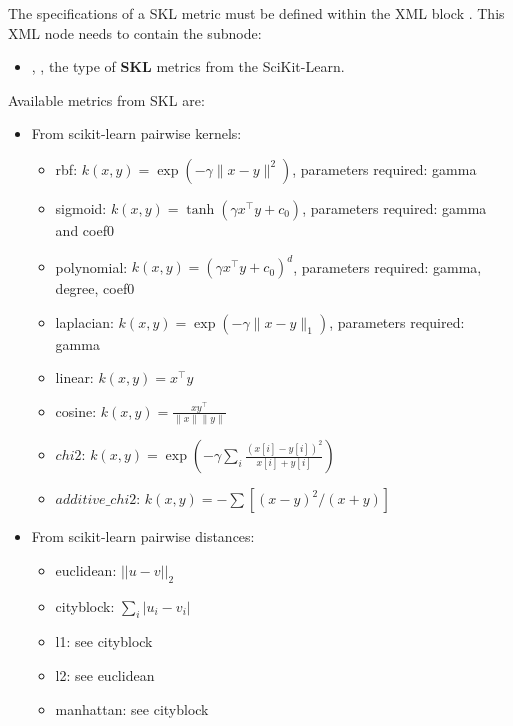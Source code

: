 The specifications of a SKL metric must be defined within the XML block .
This XML node needs to contain the subnode:
\begin{itemize}
  \item {}, , the type of \textbf{SKL} metrics from the SciKit-Learn.
\end{itemize}

Available metrics from SKL are:
\begin{itemize}
  \item   From scikit-learn pairwise kernels:
    \begin{itemize}
       \item rbf: $k(x, y) = \exp( -\gamma \| x-y \|^2)$, parameters required: gamma
       \item sigmoid: $k(x, y) = \tanh( \gamma x^\top y + c_0)$, parameters required: gamma and coef0
       \item polynomial: $k(x, y) = (\gamma x^\top y +c_0)^d$, parameters required: gamma, degree, coef0
       \item laplacian: $k(x, y) = \exp( -\gamma \| x-y \|_1)$, parameters required: gamma
       \item linear: $k(x, y) = x^\top y$
       \item cosine: $k(x, y) = \frac{x y^\top}{\|x\| \|y\|}$
       \item $chi2$: $k(x, y) = \exp \left (-\gamma \sum_i \frac{(x[i] - y[i]) ^ 2}{x[i] + y[i]} \right )$
       \item $additive\_chi2$: $k(x, y) = -\sum [(x - y)^2 / (x + y)]$
    \end{itemize}

  \item   From scikit-learn pairwise distances:
    \begin{itemize}
      \item euclidean: ${||u-v||}_2$
      \item cityblock: $\sum_i {\left| u_i - v_i \right|}$
      \item l1: see cityblock
      \item l2: see euclidean
      \item manhattan: see cityblock
    \end{itemize}


\end{itemize}
